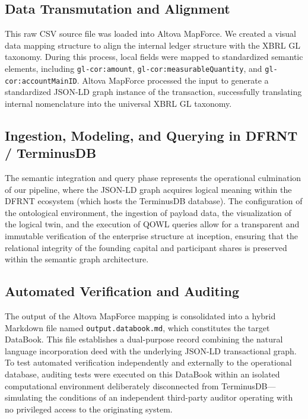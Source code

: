 \documentclass[12pt, a4paper]{article}
\begin{document}
\subsection{Data Transmutation and Alignment}

This raw CSV source file was loaded into Altova MapForce. We created a visual data mapping structure to align the internal ledger structure with the XBRL GL taxonomy. During this process, local fields were mapped to standardized semantic elements, including \texttt{gl-cor:amount}, \texttt{gl-cor:measurableQuantity}, and \texttt{gl-cor:accountMainID}. Altova MapForce processed the input to generate a standardized JSON-LD graph instance of the transaction, successfully translating internal nomenclature into the universal XBRL GL taxonomy.

\subsection{Ingestion, Modeling, and Querying in DFRNT / TerminusDB}

The semantic integration and query phase represents the operational culmination of our pipeline, where the JSON-LD graph acquires logical meaning within the DFRNT ecosystem (which hosts the TerminusDB database). The configuration of the ontological environment, the ingestion of payload data, the visualization of the logical twin, and the execution of QOWL queries allow for a transparent and immutable verification of the enterprise structure at inception, ensuring that the relational integrity of the founding capital and participant shares is preserved within the semantic graph architecture.

\subsection{Automated Verification and Auditing}

The output of the Altova MapForce mapping is consolidated into a hybrid Markdown file named \texttt{output.databook.md}, which constitutes the target DataBook. This file establishes a dual-purpose record combining the natural language incorporation deed with the underlying JSON-LD transactional graph. To test automated verification independently and externally to the operational database, auditing tests were executed on this DataBook within an isolated computational environment deliberately disconnected from TerminusDB---simulating the conditions of an independent third-party auditor operating with no privileged access to the originating system.
\end{document}
